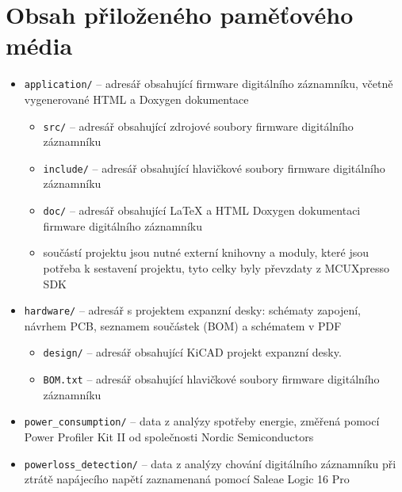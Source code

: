 
%

\chapter{Obsah přiloženého paměťového média}

\begin{itemize}
    \item \texttt{application/} -- adresář obsahující firmware digitálního záznamníku, včetně vygenerované HTML a Doxygen dokumentace
    \begin{itemize}
        \item \texttt{src/} -- adresář obsahující zdrojové soubory firmware digitálního záznamníku
        \item \texttt{include/} -- adresář obsahující hlavičkové soubory firmware digitálního záznamníku
        \item \texttt{doc/} -- adresář obsahující LaTeX a HTML Doxygen dokumentaci firmware digitálního záznamníku
        \item součástí projektu jsou nutné externí knihovny a moduly, které jsou potřeba k sestavení projektu, tyto celky byly převzdaty z MCUXpresso SDK
    \end{itemize}
    \item \texttt{hardware/} -- adresář s projektem expanzní desky: schématy zapojení, návrhem PCB, seznamem součástek (BOM) a schématem v PDF

    \begin{itemize}
        \item \texttt{design/} -- adresář obsahující KiCAD projekt expanzní desky.
        \item \texttt{BOM.txt} -- adresář obsahující hlavičkové soubory firmware digitálního záznamníku
    \end{itemize}
    
    \item \texttt{power\_consumption/} -- data z analýzy spotřeby energie, změřená pomocí Power Profiler Kit II od společnosti Nordic Semiconductors

    \item \texttt{powerloss\_detection/} -- data z analýzy chování digitálního záznamníku při ztrátě napájecího napětí zaznamenaná pomocí Saleae Logic 16 Pro
    

\end{itemize}
